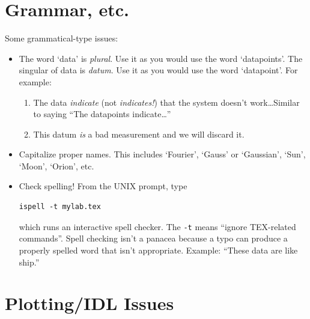 \documentclass[12pt,preprint]{aastex}
\begin{document}
\section{ Grammar, etc.}

	Some grammatical-type issues: \begin{itemize}

	\item The word `data' is {\it plural}. Use it as you would use
the word `datapoints'. The singular of data is {\it datum}. Use it as
you would use the word `datapoint'. For example: \begin{enumerate}

	\item The data {\it indicate} (not {\it indicates!}) that the
system doesn't work\dots Similar to saying ``The datapoints
indicate\dots''

	\item This datum {\it is} a bad measurement and we will discard
it.  
\end{enumerate}

	\item Capitalize proper names. This includes `Fourier', `Gauss'
or `Gaussian', `Sun', `Moon', `Orion', etc.

	\item Check spelling! From the UNIX prompt, type

\begin{verbatim}
ispell -t mylab.tex
\end{verbatim}

\noindent which runs an interactive spell checker. The \verb$-t$ means
``ignore TEX-related commands''. Spell checking isn't a panacea because a
typo can produce a properly spelled word that isn't appropriate.
Example: ``These data are like ship.''

\end{itemize}

\section{ Plotting/IDL Issues} \label{plotting}
\end{document}
